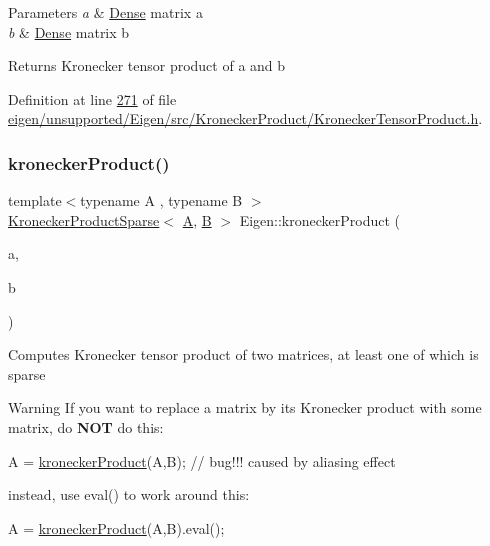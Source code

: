 \begin{DoxyParams}{Parameters}
{\em a} & \hyperlink{struct_eigen_1_1_dense}{Dense} matrix a \\
\hline
{\em b} & \hyperlink{struct_eigen_1_1_dense}{Dense} matrix b \\
\hline
\end{DoxyParams}
\begin{DoxyReturn}{Returns}
Kronecker tensor product of a and b 
\end{DoxyReturn}


Definition at line \hyperlink{eigen_2unsupported_2_eigen_2src_2_kronecker_product_2_kronecker_tensor_product_8h_source_l00271}{271} of file \hyperlink{eigen_2unsupported_2_eigen_2src_2_kronecker_product_2_kronecker_tensor_product_8h_source}{eigen/unsupported/\+Eigen/src/\+Kronecker\+Product/\+Kronecker\+Tensor\+Product.\+h}.

\mbox{\label{namespace_eigen_a4e6cd3acfea39bcff3fa38e0de1226f5}} 
\subsubsection{\texorpdfstring{kronecker\+Product()}{kroneckerProduct()}\hspace{0.1cm}{\footnotesize\ttfamily [2/2]}}
{\footnotesize\ttfamily template$<$typename A , typename B $>$ \\
\hyperlink{class_eigen_1_1_kronecker_product_sparse}{Kronecker\+Product\+Sparse}$<$ \hyperlink{group___core___module_class_eigen_1_1_matrix}{A}, \hyperlink{group___core___module_class_eigen_1_1_matrix}{B} $>$ Eigen\+::kronecker\+Product (\begin{DoxyParamCaption}\item[{const \hyperlink{group___core___module_struct_eigen_1_1_eigen_base}{Eigen\+Base}$<$ \hyperlink{group___core___module_class_eigen_1_1_matrix}{A} $>$ \&}]{a,  }\item[{const \hyperlink{group___core___module_struct_eigen_1_1_eigen_base}{Eigen\+Base}$<$ \hyperlink{group___core___module_class_eigen_1_1_matrix}{B} $>$ \&}]{b }\end{DoxyParamCaption})}

Computes Kronecker tensor product of two matrices, at least one of which is sparse

\begin{DoxyWarning}{Warning}
If you want to replace a matrix by its Kronecker product with some matrix, do {\bfseries N\+OT} do this\+: 
\begin{DoxyCode}
A = \hyperlink{namespace_eigen_aedd4b7cd1e324ed0769cac2701f4d050}{kroneckerProduct}(A,B); \textcolor{comment}{// bug!!! caused by aliasing effect}
\end{DoxyCode}
 instead, use eval() to work around this\+: 
\begin{DoxyCode}
A = \hyperlink{namespace_eigen_aedd4b7cd1e324ed0769cac2701f4d050}{kroneckerProduct}(A,B).eval();
\end{DoxyCode}

\end{DoxyWarning}

